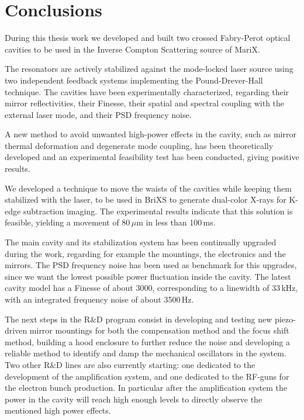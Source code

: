 \chapter{Conclusions}

During this thesis work we developed and built two crossed Fabry-Perot optical cavities to be used in the Inverse Compton Scattering source of MariX.

The resonators are actively stabilized against the mode-locked laser source using two independent feedback systems implementing the Pound-Drever-Hall technique. The cavities have been experimentally characterized, regarding their mirror reflectivities, their Finesse, their spatial and spectral coupling with the external laser mode, and their PSD frequency noise.

A new method to avoid unwanted high-power effects in the cavity, such as mirror thermal deformation and degenerate mode coupling, has been theoretically developed and an experimental feasibility test has been conducted, giving positive results. 

We developed a technique to move the waists of the cavities while keeping them stabilized with the laser, to be used in BriXS to generate dual-color X-rays for K-edge subtraction imaging. The experimental results indicate that this solution is feasible, yielding a movement of 80\,$\mu$m in less than 100\,ms.

The main cavity and its stabilization system has been continually upgraded during the work, regarding for example the mountings, the electronics and the mirrors. The PSD frequency noise has been used as benchmark for this upgrades, since we want the lowest possible power fluctuation inside the cavity. The latest cavity model has a Finesse of about 3000, corresponding to a linewidth of 33\,kHz, with an integrated frequency noise of about 3500\,Hz.

The next steps in the R\&D program consist in developing and testing new piezo-driven mirror mountings for both the compensation method and the focus shift method, building a hood enclosure to further reduce the noise and developing a reliable method to identify and damp the mechanical oscillators in the system. Two other R\&D lines are also currently starting: one dedicated to the development of the amplification system, and one dedicated to the RF-guns for the electron bunch production. In particular after the amplification system the power in the cavity will reach high enough levels to directly observe the mentioned high power effects.